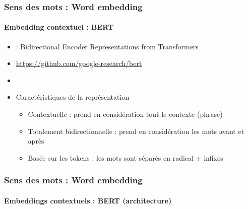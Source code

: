 \documentclass[xcolor=table]{beamer}
\begin{document}
\begin{frame}
\frametitle{Sens des mots : Word embedding}
\framesubtitle{Embedding contextuel : BERT}

\begin{minipage}{.70\textwidth}
	\begin{itemize}
		\item {} : Bidirectional Encoder Representations from Transformers
		\item \url{https://github.com/google-research/bert}
		\item \cite{2019-devlin-al}
		\item Caractéristiques de la représentation
		\begin{itemize}
			\item Contextuelle :  prend en considération tout le contexte (phrase)
			\item Totalement bidirectionnelle : prend en considération les mots avant et après 
			\item Basée sur les tokens : les mots sont séparés en radical + infixes
		\end{itemize}
	\end{itemize}
\end{minipage}
\begin{minipage}{.28\textwidth}
	\vspace{.5cm}
\end{minipage}
	
\end{frame}

\begin{frame}
\frametitle{Sens des mots : Word embedding}
\framesubtitle{Embeddings contextuels : BERT (architecture)}
	
	
\end{frame}
\end{document}

